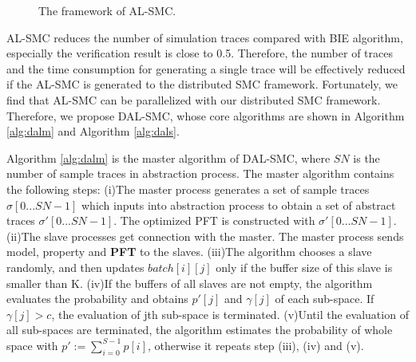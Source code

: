 \begin{figure}[htbp]
	\caption{The framework of AL-SMC.}\label{al-smc}
\end{figure}

AL-SMC reduces the number of simulation traces compared with BIE algorithm, especially the verification result is close to 0.5. Therefore, the number of traces and the time consumption for generating a single trace will be effectively reduced if the AL-SMC is generated to the distributed SMC framework. Fortunately, we find that AL-SMC can be  parallelized with our distributed SMC framework. Therefore, we propose DAL-SMC, whose core algorithms are shown in Algorithm \ref{alg:dalm} and Algorithm \ref{alg:dals}.

Algorithm \ref{alg:dalm} is the master algorithm of DAL-SMC, where $SN$ is the number of sample traces in abstraction process. The master algorithm contains the following steps: (i)The master process generates a set of sample traces $\sigma[0...SN-1]$ which inputs into abstraction process to obtain a set of abstract traces $\sigma'[0...SN-1]$. The optimized PFT is constructed with $\sigma'[0...SN-1]$. (ii)The slave processes get connection with the master. The master process sends model, property and \textbf{PFT} to the slaves. (iii)The algorithm chooses a slave randomly, and then updates $batch[i][j]$ only if the buffer size of this slave is smaller than K. (iv)If the buffers of all slaves are not empty, the algorithm evaluates the probability and obtains $p'[j]$ and $\gamma[j]$ of each sub-space. If $\gamma[j] > c$, the evaluation of jth sub-space is terminated. (v)Until the evaluation of all sub-spaces are terminated, the algorithm estimates the probability of whole space with $p' := \sum\limits_{i=0}^{S-1} p[i]$, otherwise it repeats step (iii), (iv) and (v).

